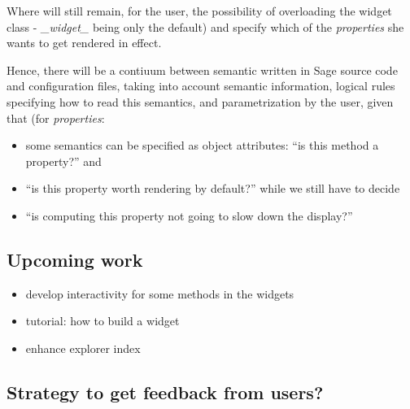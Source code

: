 \documentclass{deliverablereport}
\begin{document}
Where will still remain, for the user, the possibility of overloading
the widget class - \emph{\_widget\_} being only the default) and
specify which of the \emph{properties} she wants to get rendered in effect.

Hence, there will be a contiuum between semantic written in Sage
source code and configuration files, taking into account semantic
information, logical rules specifying how to read this semantics, and
parametrization by the user, given that (for \emph{properties}:

\begin{itemize}
\item some semantics can be specified as object attributes: ``is this method a
  property?'' and
  \item ``is this property worth rendering by default?''  while we
    still have to decide
  \item ``is computing this property not going to slow down the display?''
\end{itemize}

\subsection{Upcoming work}

\begin{itemize}
\item develop interactivity for some methods in the widgets
\item tutorial: how to build a widget
\item enhance explorer index
\end{itemize}

\subsection{Strategy to get feedback from users?}


\appendix

\end{document}
